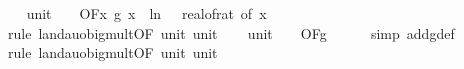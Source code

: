 \begin{isabellebody}
\isanewline
\ \ \isamarkupfalse%
\ unit{\isacharunderscore}{\kern0pt}{}{\isacharcolon}{\kern0pt}\ {\isachardoublequoteopen}{\isacharparenleft}{\kern0pt}{\isasymlambda}{\isacharunderscore}{\kern0pt}{\isachardot}{\kern0pt}\ {}{\isacharparenright}{\kern0pt}\ {\isasymin}\ O{\isacharbrackleft}{\kern0pt}{\isacharquery}{\kern0pt}F{\isacharbrackright}{\kern0pt}{\isacharparenleft}{\kern0pt}{\isasymlambda}x{\isachardot}{\kern0pt}\ g{}\ x\ {\isacharasterisk}{\kern0pt}\ ln\ {\isacharparenleft}{\kern0pt}{}\ {\isacharslash}{\kern0pt}\ real{\isacharunderscore}{\kern0pt}of{\isacharunderscore}{\kern0pt}rat\ {\isacharparenleft}{\kern0pt}{\isasymepsilon}{\isacharunderscore}{\kern0pt}of\ x{\isacharparenright}{\kern0pt}{\isacharparenright}{\kern0pt}{\isacharparenright}{\kern0pt}{\isachardoublequoteclose}\isanewline
\ \ \ \ \isamarkupfalse%
\ {\isacharparenleft}{\kern0pt}rule\ landau{\isacharunderscore}{\kern0pt}o{\isachardot}{\kern0pt}big{\isacharunderscore}{\kern0pt}mult{\isacharunderscore}{\kern0pt}{}{\isacharbrackleft}{\kern0pt}OF\ unit{\isacharunderscore}{\kern0pt}{}\ unit{\isacharunderscore}{\kern0pt}{}{\isacharbrackright}{\kern0pt}{\isacharparenright}{\kern0pt}\isanewline
\isanewline
\ \ \isamarkupfalse%
\ unit{\isacharunderscore}{\kern0pt}{}{\isacharcolon}{\kern0pt}\ {\isachardoublequoteopen}{\isacharparenleft}{\kern0pt}{\isasymlambda}{\isacharunderscore}{\kern0pt}{\isachardot}{\kern0pt}\ {}{\isacharparenright}{\kern0pt}\ {\isasymin}\ O{\isacharbrackleft}{\kern0pt}{\isacharquery}{\kern0pt}F{\isacharbrackright}{\kern0pt}{\isacharparenleft}{\kern0pt}g{\isacharparenright}{\kern0pt}{\isachardoublequoteclose}\isanewline
\ \ \ \ \isamarkupfalse%
\ {\isacharparenleft}{\kern0pt}simp\ add{\isacharcolon}{\kern0pt}g{\isacharunderscore}{\kern0pt}def{\isacharparenright}{\kern0pt}\isanewline
\ \ \ \ \isamarkupfalse%
\ {\isacharparenleft}{\kern0pt}rule\ landau{\isacharunderscore}{\kern0pt}o{\isachardot}{\kern0pt}big{\isacharunderscore}{\kern0pt}mult{\isacharunderscore}{\kern0pt}{}{\isacharbrackleft}{\kern0pt}OF\ unit{\isacharunderscore}{\kern0pt}{}\ unit{\isacharunderscore}{\kern0pt}{}{\isacharbrackright}{\kern0pt}{\isacharparenright}{\kern0pt}\isanewline
\isanewline
\ \ \isamarkupfalse%

\end{isabellebody}
